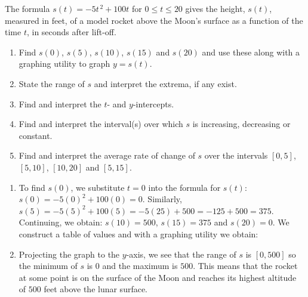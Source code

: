 \documentclass{ximera}
\begin{document}
\begin{example} \label{ARCRocketExample} The formula $s(t) = -5t^{\,2} + 100t$ for $0 \leq t \leq 20$ gives the height, $s(t)$, measured in feet, of a model rocket above the Moon's surface as a function of the time $t$, in seconds after lift-off.

\begin{enumerate}

\item Find $s(0)$, $s(5)$, $s(10)$, $s(15)$ and $s(20)$ and use these along with a graphing utility to graph $y = s(t)$.

\item State the range of $s$ and interpret the extrema, if any exist.

\item Find and interpret the $t$- and $y$-intercepts.  

\item Find and interpret the interval(s) over which $s$ is increasing, decreasing or constant.  

\item Find and interpret the average rate of change of $s$ over the intervals $[0,5]$, $[5,10]$, $[10, 20]$ and $[5, 15]$.


\end{enumerate}

\begin{explanation}

\begin{enumerate}

\item  To find $s(0)$, we substitute $t=0$ into the formula for $s(t)$:  $s(0) = -5(0)^2+100(0) = 0$.  Similarly,  $s(5) = -5(5)^2+100(5) = -5(25)+500 = -125+500 = 375$.  Continuing, we obtain: $s(10) = 500$, $s(15) = 375$ and $s(20) = 0$.  We construct a table of values and with a graphing utility we obtain:


\begin{center}
\end{center}

\item  Projecting the graph to the $y$-axis, we see that the range of $s$ is $[0, 500]$ so the minimum of $s$ is $0$ and the maximum is $500$.  This means that the rocket at some point is on the surface of the Moon and reaches its highest altitude of $500$ feet above the lunar surface.


\end{enumerate}
\end{explanation}
\end{example}
\end{document}
